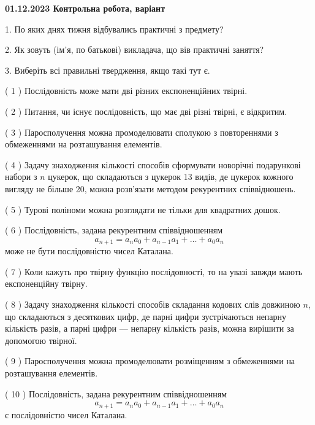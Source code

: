 \documentclass[12pt, ukrainian]{article}
\begin{document}
\vspace{4mm}
\newpage
\begin {large}

\textbf{01.12.2023 Контрольна робота, варіант  }\par


{
1. По яких днях тижня відбувались практичні з предмету?



\vspace{5mm}
2. Як зовуть (ім'я, по батькові) викладача, що вів практичні заняття?



\vspace{5mm}
3. Виберіть всі правильні твердження, якщо такі тут є.\par
\vspace{2mm}
( 1 ) Послідовність може мати дві різних експоненційних твірні.%

( 2 ) Питання, чи існує послідовність, що має дві різні твірні, є відкритим.%

( 3 ) Паросполучення можна промоделювати сполукою з повтореннями з обмеженнями на розташування елементів.%

( 4 ) Задачу знаходження кількості способів сформувати новорічні подарункові набори з $n$ цукерок, що складаються з цукерок 13 видів, де цукерок кожного вигляду не більше 20, можна розв’язати методом рекурентних співвідношень.%

( 5 ) Турові поліноми можна розглядати не тільки для квадратних дошок.%

( 6 ) Послідовність, задана рекурентним співвідношенням $$a_{n+1}=a_{n}a_{0}+a_{n-1}a_{1}+\ldots+a_0a_{n}$$ може не бути послідовністю чисел Каталана.%

( 7 ) Коли кажуть про твірну функцію послідовності, то на увазі завжди мають експоненційну твірну.%

( 8 ) Задачу знаходження кількості способів складання кодових слів довжиною $n$, що складаються з десяткових цифр, де парні цифри зустрічаються непарну кількість разів, а парні цифри — непарну кількість разів, можна вирішити за допомогою твірної.%

( 9 ) Паросполучення можна промоделювати розміщенням з обмеженнями на розташування елементів.%

( 10 ) Послідовність, задана рекурентним співвідношенням $$a_{n+1}=a_{n}a_{0}+a_{n-1}a_{1}+\ldots+a_0a_{n}$$ є послідовністю чисел Каталана.%
}
\end {large}
\end{document}
